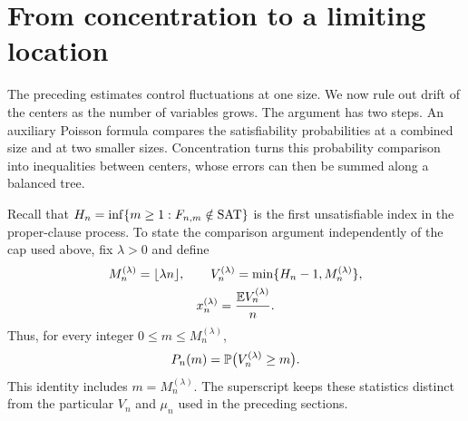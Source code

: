 \section{From concentration to a limiting location}\label{sec:convergence}

The preceding estimates control fluctuations at one size.  We now rule
out drift of the centers as the number of variables grows.  The argument
has two steps.  An auxiliary Poisson formula compares the satisfiability
probabilities at a combined size and at two smaller sizes.  Concentration
turns this probability comparison into inequalities between centers, whose
errors can then be summed along a balanced tree.

Recall that \(H_n=\inf\{m\ge1:F_{n,m}\notin\mathrm{SAT}\}\) is the first
unsatisfiable index in the proper-clause process.  To state the comparison
argument independently of the cap used above, fix \(\lambda>0\) and define
\begin{equation}\label{eq:general-capped-center}
\begin{gathered}
 M_n^{(\lambda)}=\lfloor\lambda n\rfloor,\qquad
 V_n^{(\lambda)}=\min\{H_n-1,M_n^{(\lambda)}\},\\
 x_n^{(\lambda)}=\frac{\mathbb E V_n^{(\lambda)}}{n}.
\end{gathered}
\end{equation}
Thus, for every integer \(0\le m\le M_n^{(\lambda)}\),
\begin{equation}\label{eq:general-cap-survival}
 P_n(m)=\mathbb P\bigl(V_n^{(\lambda)}\ge m\bigr).
\end{equation}
This identity includes \(m=M_n^{(\lambda)}\).  The superscript keeps
these statistics distinct from the particular \(V_n\) and \(\mu_n\)
used in the preceding sections.

